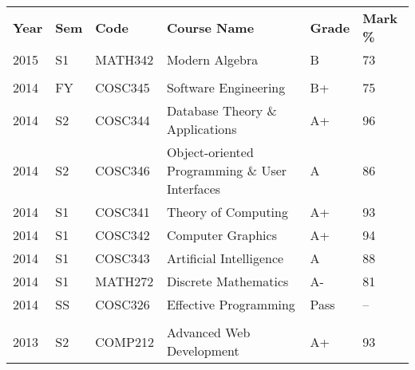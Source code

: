 \documentclass[a4paper, oneside, final]{scrartcl}
\begin{document}
      \begin{table}[h]
        \begin{tabular}{llllll}
        \rowcolor{Gray}
        \textbf{Year} & \textbf{Sem} & \textbf{Code} & \textbf{Course Name} & \textbf{Grade} & \textbf{Mark \%} \\
        2015 & S1  & MATH342 & Modern Algebra                                  & B    & 73      \\
             &     &         &                                                 &       &         \\
        2014 & FY  & COSC345 & Software Engineering                            & B+    & 75      \\
        2014 & S2  & COSC344 & Database Theory \& Applications                 & A+    & 96      \\
        2014 & S2  & COSC346 & Object-oriented Programming \& User Interfaces  & A     & 86      \\
        2014 & S1  & COSC341 & Theory of Computing                             & A+    & 93      \\
        2014 & S1  & COSC342 & Computer Graphics                               & A+    & 94      \\
        2014 & S1  & COSC343 & Artificial Intelligence                         & A     & 88      \\
        2014 & S1  & MATH272 & Discrete Mathematics                            & A-    & 81      \\
        2014 & SS  & COSC326 & Effective Programming                           & Pass  & --      \\
             &     &         &                                                 &       &         \\
        2013 & S2  & COMP212 & Advanced Web Development                        & A+    & 93      \\

\end{tabular}
\end{table}
\end{document}
